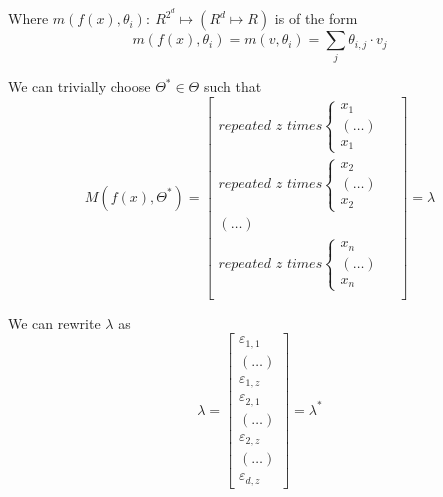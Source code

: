 \documentclass[11pt]{article}
\begin{document}
Where $m(f(x), \theta_i): \ R^{2^d} \mapsto (R^d \mapsto R)$ is of the form
\begin{equation}
    m(f(x), \theta_i)
    = 
    m(v, \theta_i)
    =
    \sum_j \theta_{i,j} \cdot v_j
\end{equation}

We can trivially choose $\Theta^* \in \Theta$ such that 
\begin{equation}
    M(f(x), \Theta^*)
    = 
    \begin{bmatrix}
        \textit{repeated $z$ times} 
        \begin{cases}
            x_1 &  \\
            (\dots) & \\
            x_1 & 
        \end{cases} \\
        \textit{repeated $z$ times} 

        \begin{cases}
            x_2 &  \\
            (\dots) & \\
            x_2 & 
        \end{cases} \\
        (\dots) \\
        \textit{repeated $z$ times} 
        \begin{cases}
            x_n &  \\
            (\dots) & \\
            x_n & 
        \end{cases} \\
    \end{bmatrix}
    = \lambda
\end{equation}

We can rewrite $\lambda$ as
\begin{equation} \label{star}
    \lambda 
    = 
    \begin{bmatrix}
        \varepsilon_{1, 1} \\
        (\dots) \\
        \varepsilon_{1, z} \\
        \varepsilon_{2, 1} \\
        (\dots) \\
        \varepsilon_{2, z} \\
        (\dots) \\
        \varepsilon_{d, z} 
    \end{bmatrix}
    = \lambda^*
\end{equation}
\end{document}
